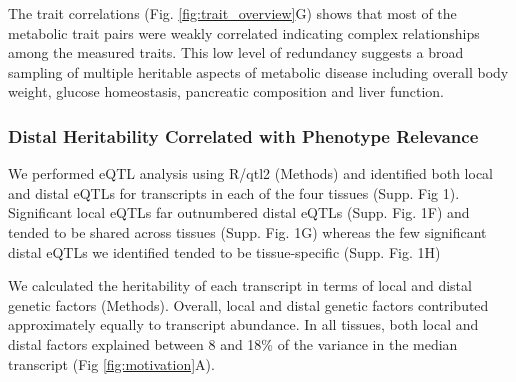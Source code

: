 \documentclass[
]{article}
\begin{document}
The trait correlations (Fig. \ref{fig:trait_overview}G) shows that most
of the metabolic trait pairs were weakly correlated indicating complex
relationships among the measured traits. This low level of redundancy
suggests a broad sampling of multiple heritable aspects of metabolic
disease including overall body weight, glucose homeostasis, pancreatic
composition and liver function.

\subsubsection{Distal Heritability Correlated with Phenotype
Relevance}\label{distal-heritability-correlated-with-phenotype-relevance}

We performed eQTL analysis using R/qtl2 \cite{pmid30591514} (Methods)
and identified both local and distal eQTLs for transcripts in each of
the four tissues (Supp. Fig 1). Significant local eQTLs far outnumbered
distal eQTLs (Supp. Fig. 1F) and tended to be shared across tissues
(Supp. Fig. 1G) whereas the few significant distal eQTLs we identified
tended to be tissue-specific (Supp. Fig. 1H)

We calculated the heritability of each transcript in terms of local and
distal genetic factors (Methods). Overall, local and distal genetic
factors contributed approximately equally to transcript abundance. In
all tissues, both local and distal factors explained between 8 and 18\%
of the variance in the median transcript (Fig \ref{fig:motivation}A).
\end{document}
